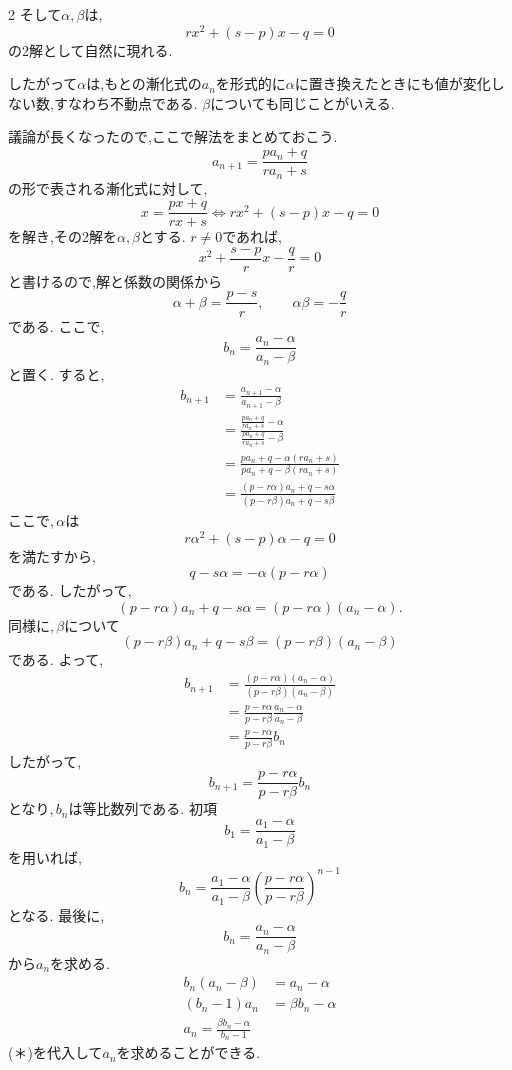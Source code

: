 \documentclass[dvipdfmx,a4paper,11pt,fleqn,openany]{jsbook}
\begin{document}
\begin{multicols*}{2}
      そして$\alpha,\beta$は,
      \[
        rx^2+(s-p)x-q=0
      \]
      の2解として自然に現れる.
      
      したがって$\alpha$は,もとの漸化式の$a_n$を形式的に$\alpha$に置き換えたときにも値が変化しない数,すなわち不動点である.
      $\beta$についても同じことがいえる.
      
      議論が長くなったので,ここで解法をまとめておこう.
      \[
        a_{n+1}=\frac{pa_n+q}{ra_n+s} 
      \]
      の形で表される漸化式に対して,
      \[
        x= \frac{px+q}{rx+s} \Leftrightarrow rx^2+(s-p)x-q=0
      \]
      を解き,その2解を$\alpha,\beta$とする.
      $r\neq0$であれば,
      \[
        x^2+\frac{s-p}{r}x-\frac qr=0
      \]
      と書けるので,解と係数の関係から
      \[
        \alpha+\beta=\frac{p-s}{r},
        \qquad
        \alpha\beta=-\frac qr
      \]
      である.
      ここで,
      \[
        b_n=\frac{a_n-\alpha}{a_n-\beta}
      \]
      と置く.
      すると,
      \begin{align*}
        b_{n+1}&=\frac{a_{n+1}-\alpha}{a_{n+1}-\beta}\\
        &=\frac{\displaystyle\frac{pa_n+q}{ra_n+s}-\alpha}{\displaystyle\frac{pa_n+q}{ra_n+s}-\beta}\\
        &=\frac{pa_n+q-\alpha(ra_n+s)}{pa_n+q-\beta(ra_n+s)}\\
        &=\frac{(p-r\alpha)a_n+q-s\alpha}{(p-r\beta)a_n+q-s\beta}
      \end{align*}
      ここで,\,$\alpha$は
      \[
        r\alpha^2+(s-p)\alpha-q=0
      \]
      を満たすから,
      \[
        q-s\alpha=-\alpha(p-r\alpha)
      \]
      である.
      したがって,
      \[
        (p-r\alpha)a_n+q-s\alpha
        =(p-r\alpha)(a_n-\alpha).
      \]
      同様に,\,$\beta$について
      \[
        (p-r\beta)a_n+q-s\beta
        =(p-r\beta)(a_n-\beta)
      \]
      である.
      よって,
      \begin{align*}
        b_{n+1}&=\frac{(p-r\alpha)(a_n-\alpha)}{(p-r\beta)(a_n-\beta)}\\
        &=\frac{p-r\alpha}{p-r\beta}\frac{a_n-\alpha}{a_n-\beta}\\
        &=\frac{p-r\alpha}{p-r\beta}b_n
      \end{align*}
      したがって,
      \[
        b_{n+1}=\frac{p-r\alpha}{p-r\beta}b_n
      \]
      となり,\,$b_n$は等比数列である.
      初項
      \[
        b_1=\frac{a_1-\alpha}{a_1-\beta}
      \]
      を用いれば,
      \[
        b_n=\frac{a_1-\alpha}{a_1-\beta}\left(\frac{p-r\alpha}{p-r\beta}\right)^{n-1} \tag*{\(\cdots\) (＊)}
      \]
      となる.
      最後に,
      \[
        b_n=\frac{a_n-\alpha}{a_n-\beta}
      \]
      から$a_n$を求める.
      \begin{align*}
        b_n(a_n-\beta)&=a_n-\alpha\\
        (b_n-1)a_n&=\beta b_n-\alpha\\
        a_n=\frac{\beta b_n-\alpha}{b_n-1}
      \end{align*}
      (＊)を代入して$a_n$を求めることができる.


\end{multicols*}
\end{document}

